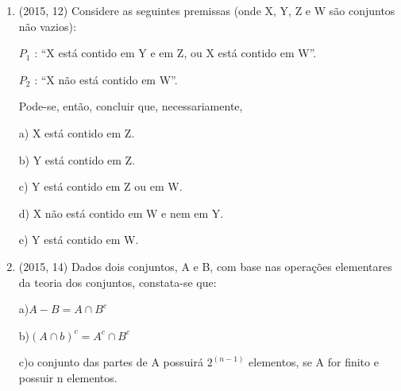 \documentclass{article}
\begin{document}
\begin{enumerate}
2. $\sim(x \lor y) \lor z$

3. $(\sim x \land \sim y) \lor z$

4. $(\sim x \lor z) \land ( \sim y \lor z) $

5. $( x \rightarrow z) \land ( y \rightarrow z) $ \newline

e)$ (x \rightarrow z)\land(y \rightarrow z)$ \newline



\textbf{CONTEÚDO}

$\rule[1cm]{100cm}{1px}$

condicional(COND) $\phi \rightarrow \psi \equiv \sim \phi \vee \psi$

DeMorgan(DM) $\sim(\phi \wedge \psi) \equiv \sim \phi \vee \sim \psi$ 

distributiva(DIS) $\phi \wedge(\psi \vee \omega) \equiv(\psi \wedge \phi) \vee(\omega \wedge \phi)$


\newpage






\item (2015, 12) Considere as seguintes premissas (onde X, Y, Z e W são conjuntos não vazios):

$P_1$ : “X está contido em Y e em Z, ou X está contido em W”.

$P_2$ : “X não está contido em W”.

Pode-se, então, concluir que, necessariamente,\newline

a) X está contido em Z.

b) Y está contido em Z.

c) Y está contido em Z ou em W.

d) X não está contido em W e nem em Y.

e) Y está contido em W.\newline







\item (2015, 14) Dados dois conjuntos, A e B, com base nas operações elementares da teoria dos conjuntos, constata-se que:\newline

a)$A-B = A\cap B^c $

b)$(A\cap b)^c = A^c \cap B^c$

c)o conjunto das partes de A possuirá $2^(n-1)$ elementos, se A for finito e possuir n elementos.


\end{enumerate}
\end{document}
